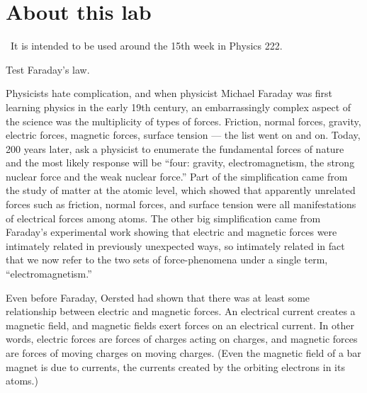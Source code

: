 \renewcommand\thechapter{c2.15a}
\label{lab:faraday}

\section*{About this lab}

\covid\ 
It is intended to be used around the 15th week in Physics 222.

\apparatus
{}


\begin{goals}

\item[] Test Faraday's law.
\end{goals}

\introduction

Physicists hate complication, and when physicist Mi\-ch\-a\-el
Faraday was first learning physics in the early 19th
century, an embarrassingly complex aspect of the science was
the multiplicity of types of forces. Friction, normal
forces, gravity, electric forces, magnetic forces, surface
tension --- the list went on and on. Today, 200 years later,
ask a physicist to enumerate the fundamental forces of
nature and the most likely response will be ``four: gravity,
electromagnetism, the strong nuclear force and the weak
nuclear force.'' Part of the simplification came from the
study of matter at the atomic level, which showed that
apparently unrelated forces such as friction, normal forces,
and surface tension were all manifestations of electrical
forces among atoms. The other big simplification came from
Faraday's experimental work showing that electric and
magnetic forces were intimately related in previously
unexpected ways, so intimately related in fact that we now
refer to the two sets of force-phenomena under a single
term, ``electromagnetism.''

Even before Faraday, Oersted had shown that there was at
least some relationship between electric and magnetic
forces. An electrical current creates a magnetic field, and
magnetic fields exert forces on an electrical current. In
other words, electric forces are forces of charges acting on
charges, and magnetic forces are forces of moving charges on
moving charges. (Even the magnetic field of a bar magnet is
due to currents, the currents created by the orbiting
electrons in its atoms.)


